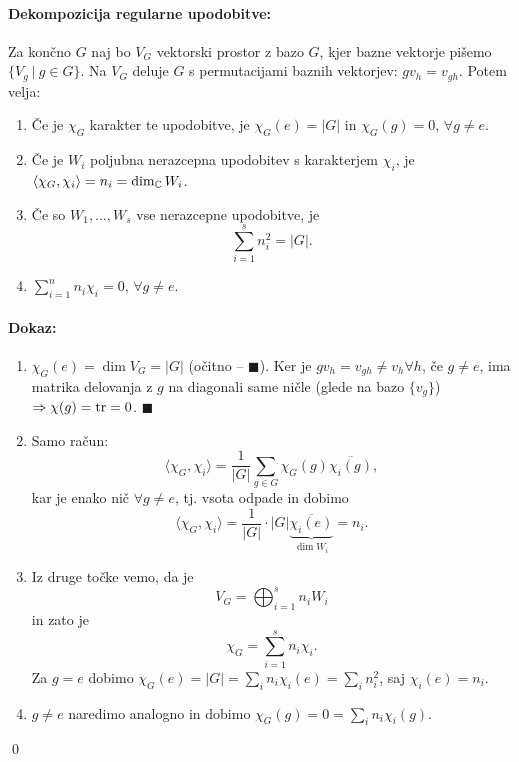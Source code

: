 \begin{trditev}
	\paragraph{Dekompozicija regularne upodobitve:} Za kon\v cno $G$ naj bo $V_G$ vektorski prostor z bazo $G$, kjer bazne vektorje
	pi\v semo $\{V_g\ |\ g\in G\}$. Na $V_G$ deluje $G$ s permutacijami baznih vektorjev: $gv_h = v_{gh}$. Potem velja:
	\begin{enumerate}
		\item{\v Ce je $\chi_G$ karakter te upodobitve, je $\chi_G(e) = |G|$ in $\chi_G(g) = 0$, $\forall g \neq e$.}
		\item{\v Ce je $W_i$ poljubna nerazcepna upodobitev s karakterjem $\chi_i$, je $\langle \chi_G,\chi_i\rangle = n_i =
			\dim_{\mathbb{C}} W_i$.}
		\item{\v Ce so $W_1,\ldots,W_s$ vse nerazcepne upodobitve, je
			\[
				\sum_{i = 1}^s n_i^2 = |G|.
			\]}
		\item{$\displaystyle{\sum_{i = 1}^n n_i \chi_i = 0}$, $\forall g \neq e$.}
	\end{enumerate}
\end{trditev}

\paragraph{Dokaz:}
\begin{enumerate}
	\item{$\chi_G(e) = \dim V_G = |G|$ (o\v citno -- $\blacksquare$). Ker je $gv_h = v_{gh} \neq v_h \forall h$, \v ce $g \neq e$,
		ima matrika delovanja z $g$ na diagonali same ni\v cle (glede na bazo $\{v_g\}$) $\Rightarrow \chi(g) = \operatorname{tr} = 0$. $\blacksquare$}
	\item{Samo ra\v cun:
		\[
			\langle \chi_G, \chi_i\rangle = \frac{1}{|G|}\sum_{g \in G}\chi_G(g)\overline{\chi_i(g)},
		\] kar je enako ni\v c $\forall g \neq e$, tj. vsota odpade in dobimo
		\[
			\langle \chi_G, \chi_i\rangle = \frac{1}{|G|} \cdot |G| \underbrace{\overline{\chi_i(e)}}_{\dim W_i} = n_i.
		\]}
	\item{Iz druge to\v cke vemo, da je
		\[
			V_G = \bigoplus_{i = 1}^s n_i W_i
		\]
		in zato je
		\[
			\chi_G = \sum_{i = 1}^s n_i \chi_i.
		\] Za $g = e$ dobimo $\chi_G(e) = |G| = \sum_i n_i \chi_i(e) = \sum_i n_i^2$, saj $\chi_i(e) = n_i$.}
	\item{$g \neq e$ naredimo analogno in dobimo $\chi_G(g) = 0 = \sum_i n_i \chi_i (g)$.}
\end{enumerate}
\qed

